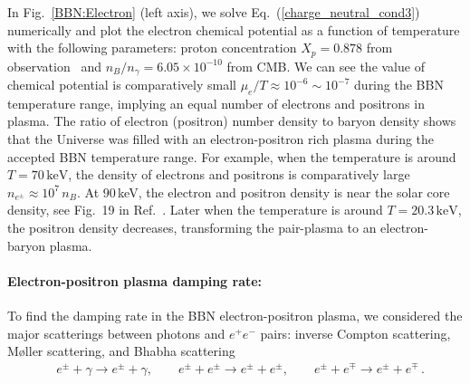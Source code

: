 In Fig.~\ref{BBN:Electron} (left axis), we solve Eq.~(\ref{charge_neutral_cond3}) numerically and plot the electron chemical potential as a function of temperature with the following parameters: proton concentration $X_p=0.878$ from observation~\cite{ParticleDataGroup:2022pth} and $n_B/n_\gamma=6.05\times10^{-10}$ from CMB. We can see the value of chemical potential is comparatively small $\mu_e/T\approx10^{-6}\sim10^{-7}$ during the BBN temperature range, implying an equal number of electrons and positrons in plasma. The ratio of electron (positron) number density to baryon density shows that the Universe was filled with an electron-positron rich plasma during the accepted BBN temperature range. For example, when the temperature is around $T=70\,\mathrm{keV}$, the density of electrons and positrons is comparatively large $n_{e^\pm}\approx10^7\,n_B$. At $90$\,keV, the electron and positron density is near the solar core density, see Fig.~19 in Ref.~\cite{Rafelski:2023emw}. Later when the temperature is around $T=20.3\,\mathrm{keV}$, the positron density decreases, transforming the pair-plasma to an electron-baryon plasma.





\paragraph{Electron-positron plasma damping rate:}
To find the damping rate in the BBN electron-positron plasma, we considered the major scatterings between photons and $e^+e^-$ pairs: inverse Compton scattering, M{\o}ller scattering, and Bhabha scattering
\begin{align}
&e^\pm+\gamma\longrightarrow e^\pm+\gamma,\qquad e^\pm+e^\pm\longrightarrow e^\pm+e^\pm,\qquad e^\pm+e^\mp\longrightarrow e^\pm+e^\mp\,.
\end{align}

